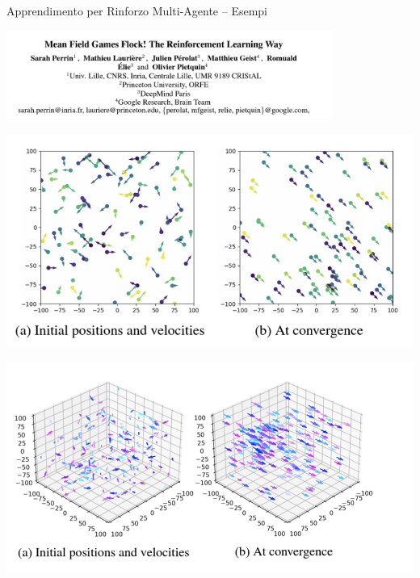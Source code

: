 \documentclass[presentation, 10pt,aspectratio=169]{beamer}\mode<presentation>{\usetheme{AMSBolognaFC}}
\begin{document}
\begin{frame}{Apprendimento per Rinforzo Multi-Agente -- Esempi}
	\begin{center}
	\includegraphics[width=0.8\textwidth]{img/learning-to-flock}
	\end{center}
	\begin{center}
	\begin{minipage}{0.45\textwidth}
	\centering
	\includegraphics[width=\textwidth]{img/flock-3.png}
	\end{minipage}
	\hfill
	\begin{minipage}{0.45\textwidth}
	\centering
	\includegraphics[width=\textwidth]{img/flock-2.png}
	\end{minipage}
	\end{center}
\end{frame}
\end{document}
